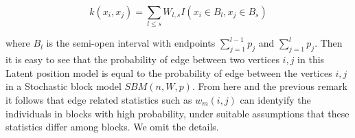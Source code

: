 \documentclass{article}
\begin{document}
\begin{equation*}
    k(x_{i},x_{j})=\sum_{l\leq s} W_{l,s} I(x_{i}\in B_l, x_{j}\in B_s)
\end{equation*}

where $B_l$ is the semi-open interval with endpoints $\sum_{j=1}^{l-1}p_j$ and $\sum_{j=1}^{l}p_j$.
Then it is easy to see that the probability of edge between two vertices $i,j$ 
in this Latent position model is equal to the probability of edge between the vertices $i,j$ in a Stochastic block model $SBM(n,W,p)$. From here 
and the previous remark 
it follows that edge related statistics such as $w_m(i,j)$ can identyify the individuals in blocks with high probability, under suitable  assumptions that these statistics differ among blocks. We omit the details.



\printbibliography
\nocite{*}
\end{document}
